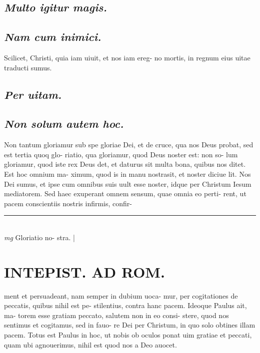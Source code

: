 \documentclass{article}
\begin{document}
\begin{pages}
\subsection*{\textit{Multo igitur magis. }}
{}
\subsection*{\textit{Nam cum inimici. }}\pstart Scilicet, Christi, quia iam uiuit, et nos iam ereg- no mortis, in regnum eius uitae traducti sumus.   \pend
{}
{}
\subsection*{\textit{Per uitam. }}
{}
\subsection*{\textit{Non solum autem hoc. }}\pstart Non tantum gloriamur sub spe gloriae Dei, et de cruce, qua nos Deus probat, sed est tertia quoq glo- riatio, qua gloriamur, quod Deus noster est: non so- lum gloriamur, quod iste rex Deus det, et daturus sit multa bona, quibus nos ditet. Est hoc omnium ma- ximum, quod is in manu nostrasit, et noster diciue lit. Nos Dei sumus, et ipse cum omnibus suis uult esse noster, idque per Christum Iesum mediatorem. Sed haec exuperant omnem sensum, quae omnia eo perti- rent, ut pacem conscientiis nostris infirmis, confir-  \pend
\vspace{0.5cm}\noindent
\vspace{0.2cm}\rule{1cm}{0.2pt}\\ 
\hspace{0.2cm}\textit{mg}
\footnotesize Gloriatio no- stra.  
\normalsize| 
\section*{INTEPIST. AD ROM.  }
\marginpar{[ p.52 ]}\pstart ment et persuadeant, nam semper in dubium uoca- mur, per cogitationes de peccatis, quibus nihil est pe- stilentius, contra hanc pacem. Ideoque Paulus ait, ma- torem esse gratiam peccato, salutem non in eo consi- stere, quod nos sentimus et cogitamus, sed in fauo- re Dei per Christum, in quo solo obtines illam pacem.  Totus est Paulus in hoc, ut nobis ob oculos ponat uim gratiae et peccati, quam ubi agnouerimus, nihil est quod nos a Deo auocet.   \pend
{}
{}

\end{pages}
\end{document}

